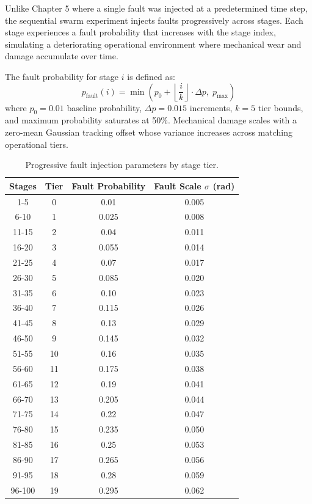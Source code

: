 \documentclass[12pt,a4paper,oneside]{report}
\begin{document}
Unlike Chapter 5 where a single fault was injected at a predetermined time step, the sequential swarm experiment injects faults progressively across stages. Each stage experiences a fault probability that increases with the stage index, simulating a deteriorating operational environment where mechanical wear and damage accumulate over time.

The fault probability for stage $i$ is defined as:
\begin{equation}
p_{\text{fault}}(i) = \min\left(p_0 + \left\lfloor \frac{i}{k} \right\rfloor \cdot \Delta p,\; p_{\text{max}}\right)
\end{equation}
where $p_0 = 0.01$ baseline probability, $\Delta p = 0.015$ increments, $k = 5$ tier bounds, and maximum probability saturates at 50\%. Mechanical damage scales with a zero-mean Gaussian tracking offset whose variance increases across matching operational tiers.

\begin{table}[H]
\centering
\caption{Progressive fault injection parameters by stage tier.}
\label{tab:fault_tiers}
\begin{tabular}{cccc}
\toprule
\textbf{Stages} & \textbf{Tier} & \textbf{Fault Probability} & \textbf{Fault Scale $\sigma$ (rad)} \\
\midrule
1-5 & 0 & 0.01 & 0.005 \\
6-10 & 1 & 0.025 & 0.008 \\
11-15 & 2 & 0.04 & 0.011 \\
16-20 & 3 & 0.055 & 0.014 \\
21-25 & 4 & 0.07 & 0.017 \\
26-30 & 5 & 0.085 & 0.020 \\
31-35 & 6 & 0.10 & 0.023 \\
36-40 & 7 & 0.115 & 0.026 \\
41-45 & 8 & 0.13 & 0.029 \\
46-50 & 9 & 0.145 & 0.032 \\
51-55 & 10 & 0.16 & 0.035 \\
56-60 & 11 & 0.175 & 0.038 \\
61-65 & 12 & 0.19 & 0.041 \\
66-70 & 13 & 0.205 & 0.044 \\
71-75 & 14 & 0.22 & 0.047 \\
76-80 & 15 & 0.235 & 0.050 \\
81-85 & 16 & 0.25 & 0.053 \\
86-90 & 17 & 0.265 & 0.056 \\
91-95 & 18 & 0.28 & 0.059 \\
96-100 & 19 & 0.295 & 0.062 \\
\bottomrule
\end{tabular}
\end{table}
\end{document}
